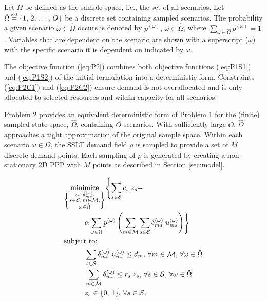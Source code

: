 \documentclass[conference]{IEEEtran}
\newcommand\myeq{\mathrel{\overset{\makebox[0pt]{\mbox{\normalfont\tiny\sffamily def}}}{=}}}
\begin{document}
Let $\Omega$ be defined as the sample space, i.e., the set of all scenarios.  Let $\hat{\Omega} \myeq \{1,\, 2,\, \ldots,\, O\}$ be a discrete set containing sampled scenarios.  The probability a given scenario $\omega \in \hat{\Omega}$ occurs is denoted by $p^{(\omega)},\, \omega \in \hat{\Omega}$, where $\sum_{\omega \in \hat{\Omega}} p^{(\omega)} = 1$.  Variables that are dependent on the scenario are shown with a superscript ($\omega$) with the specific scenario it is dependent on indicated by $\omega$.

The objective function (\ref{eq:P2}) combines both objective functions (\ref{eq:P1S1}) and (\ref{eq:P1S2}) of the initial formulation into a deterministic form.  Constraints (\ref{eq:P2C1}) and (\ref{eq:P2C2})	ensure demand is not overallocated and is only allocated to selected resources and within capacity for all scenarios.

Problem 2 provides an equivalent deterministic form of Problem 1 for the (finite) sampled state space, $\hat{\Omega}$, containing $O$ scenarios.  With sufficiently large $O$, $\hat{\Omega}$ approaches a tight approximation of the original sample space.  Within each scenario $\omega \in \hat{\Omega}$, the SSLT demand field $\rho$ is sampled to provide a set of $M$ discrete demand points.  Each sampling of $\rho$ is generated by creating a non-stationary 2D PPP with $M$ points as described in Section \ref{sec:model}.

\vspace{3mm}
\begin{tcolorbox}[title = Problem 2 (Deterministic Equivalent Program of Problem 1)]
\begin{align}
& \underset{\left\{ \substack{
	z_s,\, \delta_{ms}^{(\omega)},\\
	s \in \mathcal{S},\, m \in \mathcal{M},\\
	\omega \in \hat{\Omega}} \right\}} {\text{minimize}}
\Biggl\{ \sum_{s \in \mathcal{S}} c_s \; z_s - \nonumber \\
& \hspace{0.4in} \alpha \sum_{\omega \in \Omega} p^{(\omega)} \left( \sum_{m \in \mathcal{M}} \sum_{s \in \mathcal{S}} \delta_{ms}^{(\omega)} \; u_{ms}^{(\omega)} \right) \Biggr\} \label{eq:P2}\\
& \text{subject to:}  \nonumber \\
& \hspace{0.4in} \sum_{s \in \mathcal{S}} \delta_{ms}^{(\omega)} \; u_{ms}^{(\omega)} \leq d_m,\, \forall m \in \mathcal{M},\, \forall \omega \in \hat{\Omega} \label{eq:P2C1}\\
& \hspace{0.4in} \sum_{m \in \mathcal{M}} \delta_{ms}^{(\omega)} \leq r_s \; z_s,\, \forall s \in \mathcal{S},\, \forall \omega \in \hat{\Omega} \label{eq:P2C2}\\
& \hspace{0.4in} z_s \in \{0,\, 1\},\, \forall s \in \mathcal{S}. \label{eq:P2C3}
\end{align}
\end{tcolorbox}
\end{document}
